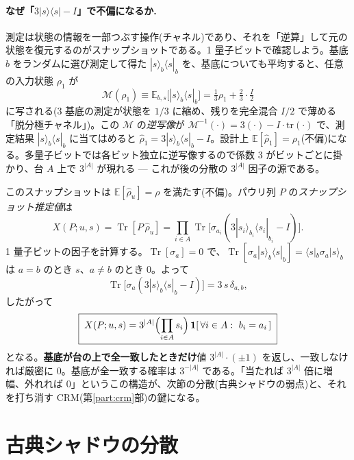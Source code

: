 \documentclass[11pt,a4paper]{ltjsarticle}
\newcommand{\bra}[1]{\langle #1|}
\newcommand{\ket}[1]{|#1\rangle}
\newcommand{\Tr}{\operatorname{Tr}}
\begin{document}
\paragraph{なぜ「$3\ket{s}\!\bra{s}-I$」で不偏になるか.}測定は状態の情報を一部つぶす操作(チャネル)であり、それを「逆算」して元の状態を復元するのがスナップショットである。1 量子ビットで確認しよう。基底 $b$ をランダムに選び測定して得た $\ket{s}_b\!\bra{s}_b$ を、基底についても平均すると、任意の入力状態 $\rho_1$ が
\begin{equation}
  \mathcal M(\rho_1) \equiv \mathbb E_{b,s}\bigl[\ket{s}_b\!\bra{s}_b\bigr] = \tfrac13\rho_1 + \tfrac23\cdot\tfrac{I}{2}
\end{equation}
に写される(3 基底の測定が状態を $1/3$ に縮め、残りを完全混合 $I/2$ で薄める「脱分極チャネル」)。この $\mathcal M$ の\emph{逆写像}が $\mathcal M^{-1}(\cdot)=3(\cdot)-I\cdot\mathrm{tr}(\cdot)$ で、測定結果 $\ket{s}_b\!\bra{s}_b$ に当てはめると $\hat\rho_1=3\ket{s}_b\!\bra{s}_b-I$。設計上 $\mathbb E[\hat\rho_1]=\rho_1$(不偏)になる。多量子ビットでは各ビット独立に逆写像するので係数 $3$ がビットごとに掛かり、台 $A$ 上で $3^{|A|}$ が現れる — これが後の分散の $3^{|A|}$ 因子の源である。

このスナップショットは $\mathbb E[\hat\rho_u]=\rho$ を満たす(不偏)。パウリ列 $P$ の\emph{スナップショット推定値}は
\begin{equation}
  X(P;u,s)=\Tr[P\,\hat\rho_u]=\prod_{i\in A}\Tr\bigl[\sigma_{a_i}(3\ket{s_i}_{b_i}\!\bra{s_i}_{b_i}-I)\bigr].
\end{equation}
1 量子ビットの因子を計算する。$\Tr[\sigma_a]=0$ で、$\Tr[\sigma_a\ket{s}_b\!\bra{s}_b]=\bra{s}_b\sigma_a\ket{s}_b$ は $a=b$ のとき $s$、$a\neq b$ のとき $0$。よって
\begin{equation}
  \Tr\bigl[\sigma_a(3\ket{s}_b\!\bra{s}_b-I)\bigr]=3\,s\,\delta_{a,b},
\end{equation}
したがって
\begin{equation}
  \boxed{\;X(P;u,s)=3^{|A|}\Bigl(\prod_{i\in A}s_i\Bigr)\,\mathbf 1[\,\forall i\in A:\ b_i=a_i\,]\;}
  \label{eq:snapshot}
\end{equation}
となる。\textbf{基底が台の上で全一致したときだけ}値 $3^{|A|}\cdot(\pm1)$ を返し、一致しなければ厳密に $0$。基底が全一致する確率は $3^{-|A|}$ である。「当たれば $3^{|A|}$ 倍に増幅、外れれば $0$」というこの構造が、次節の分散(古典シャドウの弱点)と、それを打ち消す CRM(第\ref{part:crm}部)の鍵になる。

\section{古典シャドウの分散}
\label{sec:shadowvar}
\end{document}
